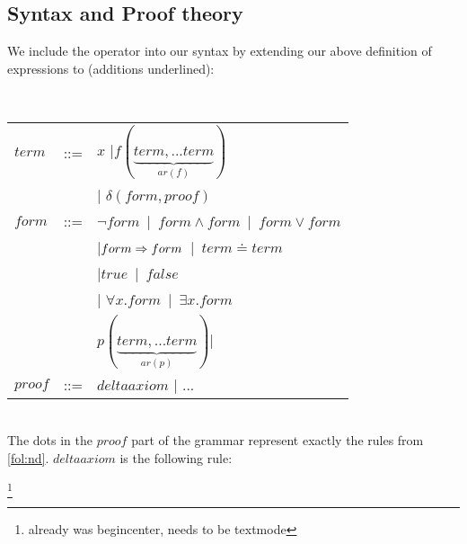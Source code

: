 \documentclass{article}
\begin{document}
\subsection{Syntax and Proof theory}

We include the operator into our syntax by extending our above definition of expressions to (additions underlined):

\begin{definition}[Expressions]\label{def:dfolexpr}\ \\

\begin{tabular}{ p{1cm}p{1cm}p{8cm}}
$term$ & ::= & $x$ |$f(\underbrace{term, ... term}_{ar(f)})$\\  
		& & | \underline{$\delta(form, proof)$} \\	
$form$ & ::= &  $\neg form$\ |\ $form\wedge form$\ |\ $form\vee form$\\
		&  & |$form\Rightarrow form$\ |\ $term\doteq term$ \\
       &  & |$true$\ |\ $false$ \\
        &   &| $\forall x.form$\ |\ $\exists x.form$\\ 
      
		&  & $p(\underbrace{term, ... term}_{ar(p)}) |$\\ 
$proof$ & ::= & \underline{$deltaaxiom$} | ...
\end{tabular}
\end{definition}
\ \\
The dots in the $proof$ part of the grammar represent exactly the rules from \ref{fol:nd}.
$deltaaxiom$ is the following rule:

\begin{center}
\ianc{}
    {}
    {}
\end{center}
\footnote{already was begin{center}, needs to be textmode}
\end{document}
